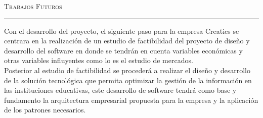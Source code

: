 \thispagestyle{empty}
\vspace*{3cm}
\noindent\Huge\textsc{Trabajos Futuros}\\
\normalsize
\noindent\rule[2pt]{\textwidth}{0.8pt}
\hspace*{3cm}

Con el desarrollo del proyecto, el siguiente paso para la empresa Creatics se centrara en la realización de un estudio de factibilidad del proyecto de diseño y desarrollo del software en donde se tendrán en cuenta variables económicas y otras variables influyentes como lo es el estudio de mercados. \\

Posterior al estudio de factibilidad se procederá a realizar el diseño y desarrollo de la solución tecnológica que permita optimizar la gestión de la información en las instituciones educativas, este desarrollo de software tendrá como base y fundamento la arquitectura empresarial propuesta para la empresa y la aplicación de los patrones necesarios.